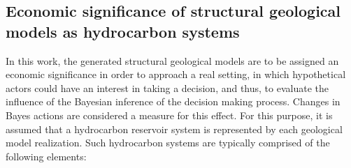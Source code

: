         \subsection{Economic significance of structural geological models as hydrocarbon systems}\label{sec:Reservoir_values}
        In this work, the generated structural geological models are to be assigned an economic significance in order to approach a real setting, in which hypothetical actors could have an interest in taking a decision, and thus, to evaluate the influence of the Bayesian inference of the decision making process. Changes in Bayes actions are considered a measure for this effect. For this purpose, it is assumed that a hydrocarbon reservoir system is represented by each geological model realization.
        Such hydrocarbon systems are typically comprised of the following elements:
